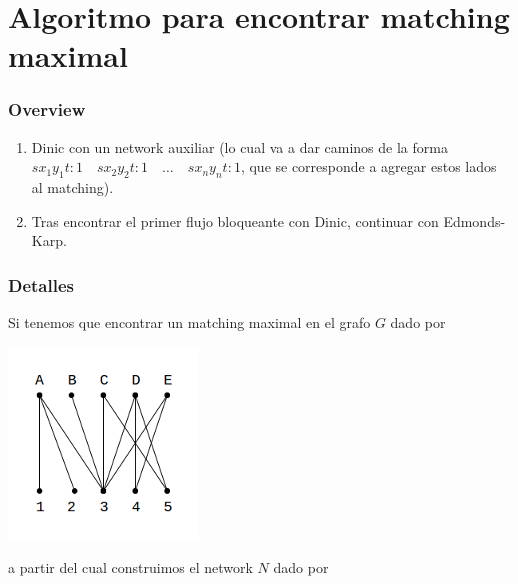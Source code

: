 \documentclass[10pt,a4paper]{article}
\begin{document}
\section*{Algoritmo para encontrar matching maximal}

\subsubsection*{Overview}

\begin{enumerate}

	\item Dinic con un network auxiliar (lo cual va a dar caminos de la forma $sx_1y_1t: 1\quad sx_2y_2t: 1\quad \dots\quad sx_ny_nt: 1$, que se corresponde a agregar estos lados al matching).
	\item Tras encontrar el primer flujo bloqueante con Dinic, continuar con Edmonds-Karp.
\end{enumerate}

\subsubsection*{Detalles}

Si tenemos que encontrar un matching maximal en el grafo $G$ dado por

\begin{center}

    \begin{adjustbox}{max size={\textwidth}{\textheight}}
        \includegraphics{definitions/matching_3.jpg}
        \end{adjustbox}
    
\end{center}

a partir del cual construimos el network $N$ dado por
\end{document}
